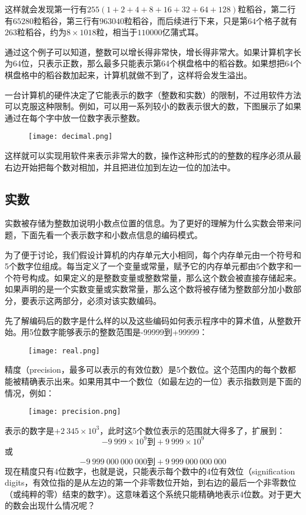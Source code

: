 这样就会发现第一行有$255(1+2+4+8+16+32+64+128)$粒稻谷，第二行有$65280$粒稻谷，第三行有$963040$粒稻谷，而后续进行下来，只是第$64$个格子就有$263$粒稻谷，约为$8\times 1018$粒，相当于$110000$亿蒲式耳。

通过这个例子可以知道，整数可以增长得非常快，增长得非常大。如果计算机字长为64位，只表示正数，那么最多只能表示第64个棋盘格中的稻谷数。如果想把64个棋盘格中的稻谷数加起来，计算机就做不到了，这样将会发生溢出。

一台计算机的硬件决定了它能表示的数字（整数和实数）的限制，不过用软件方法可以克服这种限制。例如，可以用一系列较小的数表示很大的数，下图展示了如果通过在每个字中放一位数字表示整数。

\begin{figure}[htbp]
\centering
\texttt{[image: decimal.png]}
\end{figure}

这样就可以实现用软件来表示非常大的数，操作这种形式的的整数的程序必须从最右边开始把每个数对相加，并且把进位加到左边一位的加法中。

\subsection{实数}

实数被存储为整数加说明小数点位置的信息。为了更好的理解为什么实数会带来问题，下面先看一个表示数字和小数点信息的编码模式。

为了便于讨论，我们假设计算机的内存单元大小相同，每个内存单元由一个符号和5个数字位组成。每当定义了一个变量或常量，赋予它的内存单元都由5个数字和一个符号构成。如果定义的是整数变量或整数常量，那么这个数会被直接存储起来。如果声明的是一个实数变量或实数常量，那么这个数将被存储为整数部分加小数部分，要表示这两部分，必须对该实数编码。

先了解编码后的数字是什么样的以及这些编码如何表示程序中的算术值，从整数开始。用5位数字能够表示的整数范围是-99999到+99999：

\begin{figure}[htbp]
\centering
\texttt{[image: real.png]}
\end{figure}

精度（precision，最多可以表示的有效位数）是5个数位。这个范围内的每个数都能被精确表示出来。如果用其中一个数位（如最左边的一位）表示指数则是下面的情况，例如：

\begin{figure}[htbp]
\centering
\texttt{[image: precision.png]}
\end{figure}
表示的数字是$+2~345\times 10^3$，此时这5个数位表示的范围就大得多了，扩展到：
\[-9~999\times 10^9\mbox{到}+9~999×10^9\]
或
\[-9~999~000~000~000\mbox{到}+9~999~000~000~000\]
现在精度只有4位数字，也就是说，只能表示每个数中的4位有效位（signification digits，有效位指的是从左边的第一个非零数位开始，到右边的最后一个非零数位（或纯粹的零）结束的数字）。这意味着这个系统只能精确地表示4位数。对于更大的数会出现什么情况呢？

